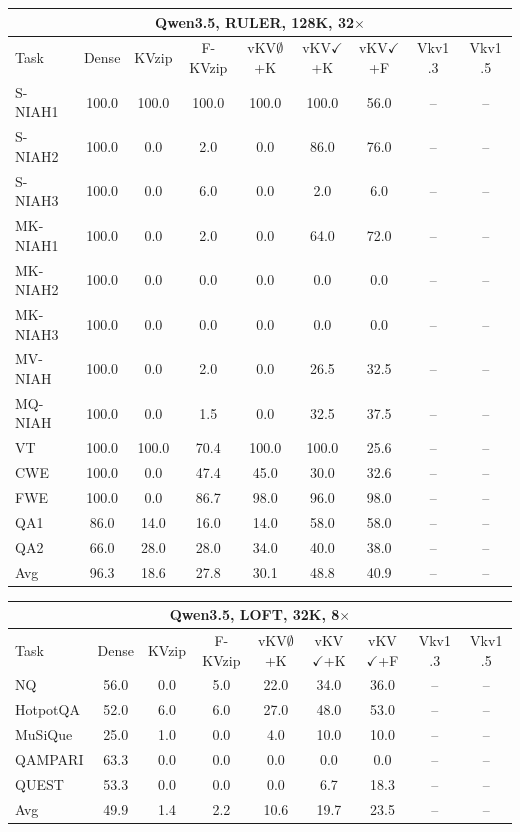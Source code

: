 \begin{tabular}{lcccccccc}
\toprule
\multicolumn{9}{c}{Qwen3.5, RULER, 128K, 32$\times$} \\
\midrule
Task & Dense & KVzip & F-KVzip & vKV$\emptyset$+K & vKV$\checkmark$+K & vKV$\checkmark$+F & Vkv1 .3 & Vkv1 .5 \\
\midrule
S-NIAH1 & 100.0 & 100.0 & 100.0 & 100.0 & 100.0 & 56.0 & -- & -- \\
S-NIAH2 & 100.0 & 0.0 & 2.0 & 0.0 & 86.0 & 76.0 & -- & -- \\
S-NIAH3 & 100.0 & 0.0 & 6.0 & 0.0 & 2.0 & 6.0 & -- & -- \\
MK-NIAH1 & 100.0 & 0.0 & 2.0 & 0.0 & 64.0 & 72.0 & -- & -- \\
MK-NIAH2 & 100.0 & 0.0 & 0.0 & 0.0 & 0.0 & 0.0 & -- & -- \\
MK-NIAH3 & 100.0 & 0.0 & 0.0 & 0.0 & 0.0 & 0.0 & -- & -- \\
MV-NIAH & 100.0 & 0.0 & 2.0 & 0.0 & 26.5 & 32.5 & -- & -- \\
MQ-NIAH & 100.0 & 0.0 & 1.5 & 0.0 & 32.5 & 37.5 & -- & -- \\
VT & 100.0 & 100.0 & 70.4 & 100.0 & 100.0 & 25.6 & -- & -- \\
CWE & 100.0 & 0.0 & 47.4 & 45.0 & 30.0 & 32.6 & -- & -- \\
FWE & 100.0 & 0.0 & 86.7 & 98.0 & 96.0 & 98.0 & -- & -- \\
QA1 & 86.0 & 14.0 & 16.0 & 14.0 & 58.0 & 58.0 & -- & -- \\
QA2 & 66.0 & 28.0 & 28.0 & 34.0 & 40.0 & 38.0 & -- & -- \\
\midrule
Avg & 96.3 & 18.6 & 27.8 & 30.1 & 48.8 & 40.9 & -- & -- \\
\bottomrule
\end{tabular}
\vspace{0.8em}

\begin{tabular}{lcccccccc}
\toprule
\multicolumn{9}{c}{Qwen3.5, LOFT, 32K, 8$\times$} \\
\midrule
Task & Dense & KVzip & F-KVzip & vKV$\emptyset$+K & vKV$\checkmark$+K & vKV$\checkmark$+F & Vkv1 .3 & Vkv1 .5 \\
\midrule
NQ & 56.0 & 0.0 & 5.0 & 22.0 & 34.0 & 36.0 & -- & -- \\
HotpotQA & 52.0 & 6.0 & 6.0 & 27.0 & 48.0 & 53.0 & -- & -- \\
MuSiQue & 25.0 & 1.0 & 0.0 & 4.0 & 10.0 & 10.0 & -- & -- \\
QAMPARI & 63.3 & 0.0 & 0.0 & 0.0 & 0.0 & 0.0 & -- & -- \\
QUEST & 53.3 & 0.0 & 0.0 & 0.0 & 6.7 & 18.3 & -- & -- \\
\midrule
Avg & 49.9 & 1.4 & 2.2 & 10.6 & 19.7 & 23.5 & -- & -- \\
\bottomrule
\end{tabular}
\vspace{0.8em}


